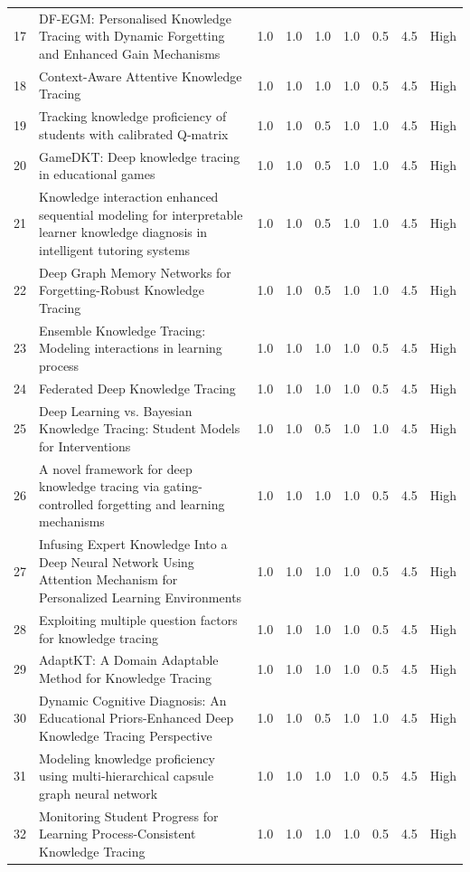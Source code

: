 \documentclass{article}
\begin{document}
\begin{longtable}{p{1cm}p{8cm}p{1cm}p{1cm}p{1cm}p{1cm}p{1cm}p{1.5cm}p{1.5cm}}
17 & DF-EGM: Personalised Knowledge Tracing with Dynamic Forgetting and Enhanced Gain Mechanisms & 1.0 & 1.0 & 1.0 & 1.0 & 0.5 & 4.5 & High \\
18 & Context-Aware Attentive Knowledge Tracing & 1.0 & 1.0 & 1.0 & 1.0 & 0.5 & 4.5 & High \\
19 & Tracking knowledge proficiency of students with calibrated Q-matrix & 1.0 & 1.0 & 0.5 & 1.0 & 1.0 & 4.5 & High \\
20 & GameDKT: Deep knowledge tracing in educational games & 1.0 & 1.0 & 0.5 & 1.0 & 1.0 & 4.5 & High \\
21 & Knowledge interaction enhanced sequential modeling for interpretable learner knowledge diagnosis in intelligent tutoring systems & 1.0 & 1.0 & 0.5 & 1.0 & 1.0 & 4.5 & High \\
22 & Deep Graph Memory Networks for Forgetting-Robust Knowledge Tracing & 1.0 & 1.0 & 0.5 & 1.0 & 1.0 & 4.5 & High \\
23 & Ensemble Knowledge Tracing: Modeling interactions in learning process & 1.0 & 1.0 & 1.0 & 1.0 & 0.5 & 4.5 & High \\
24 & Federated Deep Knowledge Tracing & 1.0 & 1.0 & 1.0 & 1.0 & 0.5 & 4.5 & High \\
25 & Deep Learning vs. Bayesian Knowledge Tracing: Student Models for Interventions & 1.0 & 1.0 & 0.5 & 1.0 & 1.0 & 4.5 & High \\
26 & A novel framework for deep knowledge tracing via gating-controlled forgetting and learning mechanisms & 1.0 & 1.0 & 1.0 & 1.0 & 0.5 & 4.5 & High \\
27 & Infusing Expert Knowledge Into a Deep Neural Network Using Attention Mechanism for Personalized Learning Environments & 1.0 & 1.0 & 1.0 & 1.0 & 0.5 & 4.5 & High \\
28 & Exploiting multiple question factors for knowledge tracing & 1.0 & 1.0 & 1.0 & 1.0 & 0.5 & 4.5 & High \\
29 & AdaptKT: A Domain Adaptable Method for Knowledge Tracing & 1.0 & 1.0 & 1.0 & 1.0 & 0.5 & 4.5 & High \\
30 & Dynamic Cognitive Diagnosis: An Educational Priors-Enhanced Deep Knowledge Tracing Perspective & 1.0 & 1.0 & 0.5 & 1.0 & 1.0 & 4.5 & High \\
31 & Modeling knowledge proficiency using multi-hierarchical capsule graph neural network & 1.0 & 1.0 & 1.0 & 1.0 & 0.5 & 4.5 & High \\
32 & Monitoring Student Progress for Learning Process-Consistent Knowledge Tracing & 1.0 & 1.0 & 1.0 & 1.0 & 0.5 & 4.5 & High \\

\end{longtable}
\end{document}
